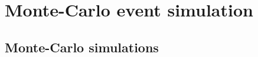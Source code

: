 \chapter[MC event generation]{Monte-Carlo event simulation}
\label{chap:MC}


\section{Monte-Carlo simulations}
\label{sec:MC}
